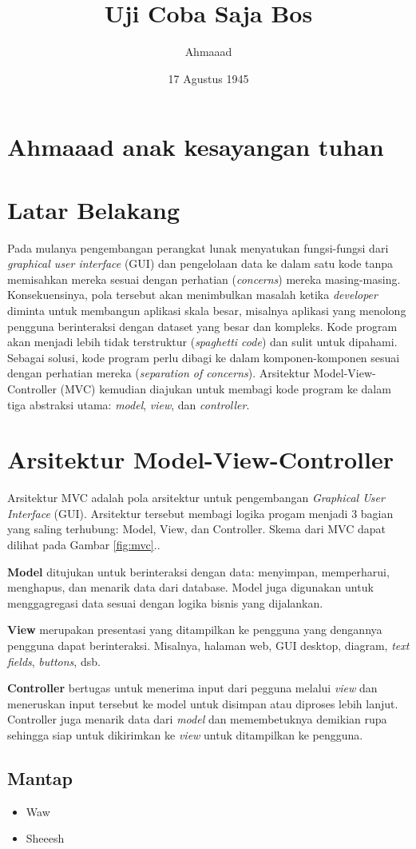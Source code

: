 \documentclass[10pt,a4paper]{article}
\begin{document}
\author{Ahmaaad}
\title{Uji Coba Saja Bos}
\date{17 Agustus 1945}

\section{Ahmaaad anak kesayangan tuhan}
\section{Latar Belakang}
Pada mulanya pengembangan perangkat lunak menyatukan fungsi-fungsi dari \textit{graphical user interface} (GUI) dan pengelolaan data ke dalam satu kode tanpa memisahkan mereka sesuai dengan perhatian (\textit{concerns}) mereka masing-masing. 
Konsekuensinya, pola tersebut akan menimbulkan masalah ketika \textit{developer} diminta untuk membangun aplikasi  skala besar,  misalnya aplikasi yang menolong pengguna berinteraksi dengan dataset yang besar dan kompleks. Kode program akan menjadi lebih tidak terstruktur (\textit{spaghetti code}) dan sulit untuk dipahami. 
Sebagai solusi, kode program perlu dibagi ke dalam komponen-komponen sesuai dengan perhatian mereka (\textit{separation of concerns}). 
Arsitektur Model-View-Controller (MVC) kemudian diajukan untuk membagi kode program ke dalam tiga abstraksi utama: \textit{model}, \textit{view}, dan \textit{controller}.

\section{Arsitektur Model-View-Controller}
Arsitektur MVC adalah pola arsitektur untuk pengembangan \textit{Graphical User Interface} (GUI). Arsitektur tersebut membagi logika progam menjadi 3 bagian yang saling terhubung: Model, View, dan Controller. Skema dari MVC dapat dilihat pada Gambar \ref{fig:mvc}..

\textbf{Model} ditujukan untuk berinteraksi dengan data: menyimpan, memperharui, menghapus, dan menarik data dari database. Model juga digunakan untuk menggagregasi data sesuai dengan logika bisnis yang dijalankan. 

\textbf{View} merupakan presentasi yang ditampilkan ke pengguna yang dengannya pengguna dapat berinteraksi. Misalnya, halaman web, GUI desktop, diagram, \textit{text fields}, \textit{buttons}, dsb.

\textbf{Controller} bertugas untuk menerima input dari pegguna melalui \textit{view} dan meneruskan input tersebut ke model untuk disimpan atau diproses lebih lanjut. Controller juga menarik data dari \textit{model} dan memembetuknya demikian rupa sehingga siap untuk dikirimkan ke \textit{view} untuk ditampilkan ke pengguna.

\subsection{Mantap}
\begin{itemize}
	\item Waw
	\item Sheeesh
\end{itemize}
\end{document}
